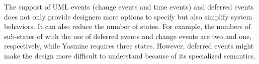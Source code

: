 The support of UML events (change events and time events) and deferred events does not only provide designers more options to specify but also simplify system behaviors. 
It can also reduce the number of states.
For example, the numbers of sub-states of  with the use of deferred events and change events are two and one, respectively, while Yasmine requires three states.   
However, deferred events might make the design more difficult to understand because of its specialized semantics.  

